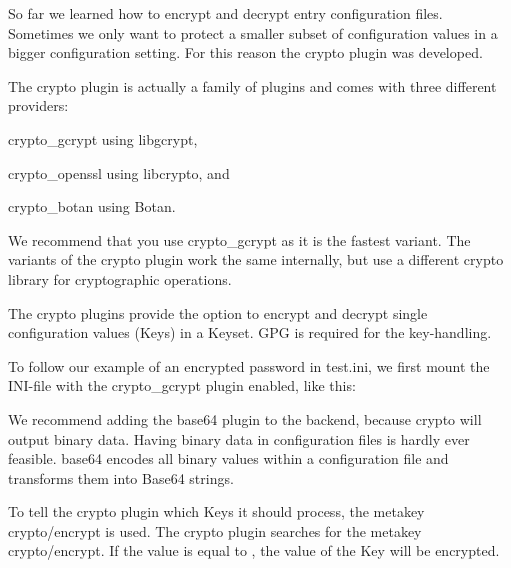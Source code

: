 \begin{DoxyCode}{0}
\end{DoxyCode}


So far we learned how to encrypt and decrypt entry configuration files. Sometimes we only want to protect a smaller subset of configuration values in a bigger configuration setting. For this reason the {\ttfamily crypto} plugin was developed.

The {\ttfamily crypto} plugin is actually a family of plugins and comes with three different providers\+:


\begin{DoxyEnumerate}
\item {\ttfamily crypto\+\_\+gcrypt} using {\ttfamily libgcrypt},
\item {\ttfamily crypto\+\_\+openssl} using {\ttfamily libcrypto}, and
\item {\ttfamily crypto\+\_\+botan} using {\ttfamily Botan}.
\end{DoxyEnumerate}

We recommend that you use {\ttfamily crypto\+\_\+gcrypt} as it is the fastest variant. The variants of the {\ttfamily crypto} plugin work the same internally, but use a different crypto library for cryptographic operations.

The {\ttfamily crypto} plugins provide the option to encrypt and decrypt single configuration values (Keys) in a Keyset. G\+PG is required for the key-\/handling.

To follow our example of an encrypted password in {\ttfamily test.\+ini}, we first mount the I\+N\+I-\/file with the {\ttfamily crypto\+\_\+gcrypt} plugin enabled, like this\+:


\begin{DoxyCode}{0}
\end{DoxyCode}


We recommend adding the {\ttfamily base64} plugin to the backend, because {\ttfamily crypto} will output binary data. Having binary data in configuration files is hardly ever feasible. {\ttfamily base64} encodes all binary values within a configuration file and transforms them into Base64 strings.

To tell the {\ttfamily crypto} plugin which Keys it should process, the metakey {\ttfamily crypto/encrypt} is used. The {\ttfamily crypto} plugin searches for the metakey {\ttfamily crypto/encrypt}. If the value is equal to {}, the value of the Key will be encrypted.

